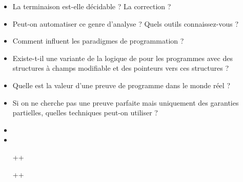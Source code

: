 \documentclass{agregfiche}
\begin{document}
\secquestionsclassiques

\begin{itemize}
	\item La terminaison est-elle décidable ? La correction ?
    \item Peut-on automatiser ce genre d'analyse ? Quels outils
    connaissez-vous ?
    \item Comment influent les paradigmes de programmation ?
    \item  Existe-t-il une variante de la logique de  pour
    les programmes avec des structures à champs modifiable et des
    pointeurs vers ces structures ?
    \item Quelle est la valeur d'une preuve de programme dans le
    monde réel ?
    \item Si on ne cherche pas une preuve parfaite mais uniquement
    des garanties partielles, quelles techniques peut-on utiliser ?

\end{itemize}

\secreferences

\begin{itemize}
\item 
\item 
\end{itemize}

\secdev

\begin{itemize}
\item[++] 
\item [++]
\end{itemize}
\end{document}
